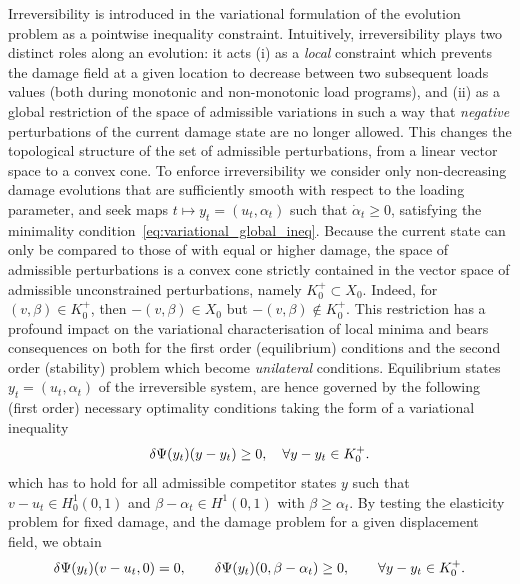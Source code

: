 \documentclass[10pt]{article}
\begin{document}
Irreversibility is introduced in the variational formulation of the evolution problem as a pointwise inequality constraint. Intuitively, irreversibility plays two distinct roles along an evolution: it acts (i) as a \emph{local} constraint which prevents the damage field at a given location to decrease between two subsequent loads values (both during monotonic and non-monotonic load programs), and (ii) as a global restriction of the space of admissible variations in such a way that \emph{negative} perturbations of the current damage state are no longer allowed. This changes the topological structure of the set of admissible perturbations, from a linear vector space to a convex cone. 
To enforce irreversibility we consider only non-decreasing damage evolutions that are sufficiently smooth with respect to the loading parameter, and seek maps $t\mapsto y_t = (u_t, \alpha_t)$ such that $\dot \alpha_t \geq 0$,  satisfying the minimality condition~\eqref{eq:variational_global_ineq}.
Because the current state can only be compared to those of with equal or higher damage, the space of admissible perturbations is a  convex cone strictly contained in the vector space of admissible unconstrained perturbations, namely $K^+_0\subset X_0$. Indeed, for $(v, \beta)\in K^+_0$, then $-(v, \beta) \in X_0$ but $-(v, \beta)\notin K^+_0$. This restriction has a profound impact on the variational characterisation of local minima and bears consequences on both for the first order (equilibrium) conditions and the second order (stability) problem which become \emph{unilateral} conditions.
%
Equilibrium states $y_t=(u_t, \alpha_t)$ of the irreversible system, are hence governed by the following (first order) necessary optimality conditions taking the form of a variational inequality
\begin{equation}
    \label{eq:eq_variational_inequality_full}
    \delta \Psi(y_t)(y-y_t) \geq 0, \quad \forall y-y_t \in K^+_0.
\end{equation}
%
which has to hold for all admissible competitor states $y$ such that $v-u_t \in H^1_0(0, 1)$ and $\beta-\alpha_t\in H^1(0,1)$ with $\beta \geq \alpha_t$.
%
%
By testing the elasticity problem for fixed damage, and the damage problem for a given displacement field, we obtain 
\begin{equation}
    \label{eq:variational_equilibrium} 
    \delta \Psi(y_t)(v-u_t, 0) = 0, \qquad \delta \Psi(y_t)(0, \beta-\alpha_t) \geq 0, \qquad \forall y-y_t \in K^+_{0}.
\end{equation}
\end{document}
